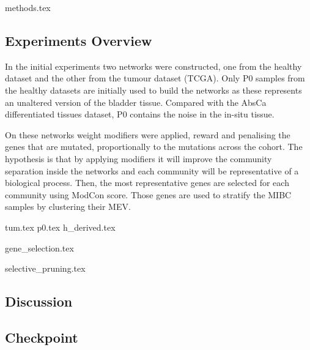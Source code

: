 

{methods.tex}

\newpage

\subsection{Experiments Overview}


In the initial experiments two networks were constructed, one from the healthy dataset and the other from the tumour dataset (TCGA). Only P0 samples from the healthy datasets are initially used to build the networks as these represents an unaltered version of the bladder tissue. Compared with the AbsCa differentiated tissues dataset, P0 contains the noise in the in-situ tissue.

On these networks weight modifiers were applied, reward and penalising the genes that are mutated, proportionally to the mutations across the cohort. The hypothesis is that by applying modifiers it will improve the community separation inside the networks and each community will be representative of a biological process. Then, the most representative genes are selected for each community using ModCon score. Those  genes are used to stratify the MIBC samples by clustering their MEV.

{tum.tex}
\newpage
{p0.tex}
\newpage
{h_derived.tex}
\newpage

{gene_selection.tex}
\newpage

\newpage
{selective_pruning.tex}

\newpage

\subsection{Discussion}


\subsection{Checkpoint}


